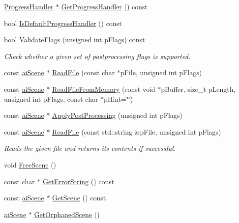 \begin{DoxyCompactItemize}
\hyperlink{class_assimp_1_1_progress_handler}{Progress\+Handler} $\ast$ \hyperlink{class_assimp_1_1_importer_ad5ab2509d8e72d6a58c55e6173179552}{Get\+Progress\+Handler} () const 
\item 
bool \hyperlink{class_assimp_1_1_importer_abfc6a55b0ab6b9e3e84c8135f686e012}{Is\+Default\+Progress\+Handler} () const 
\item 
bool \hyperlink{class_assimp_1_1_importer_af0053e7209aaca4e291359af16f3c0b6}{Validate\+Flags} (unsigned int p\+Flags) const 
\begin{DoxyCompactList}\small\item\em Check whether a given set of postprocessing flags is supported. \end{DoxyCompactList}\item 
const \hyperlink{structai_scene}{ai\+Scene} $\ast$ \hyperlink{class_assimp_1_1_importer_afa338a135a56956bd5deb7d238498dde}{Read\+File} (const char $\ast$p\+File, unsigned int p\+Flags)
\item 
const \hyperlink{structai_scene}{ai\+Scene} $\ast$ \hyperlink{class_assimp_1_1_importer_a9a423cef9ecadc777ea6c3952beb3ca2}{Read\+File\+From\+Memory} (const void $\ast$p\+Buffer, size\+\_\+t p\+Length, unsigned int p\+Flags, const char $\ast$p\+Hint=\char`\"{}\char`\"{})
\item 
const \hyperlink{structai_scene}{ai\+Scene} $\ast$ \hyperlink{class_assimp_1_1_importer_ace2fb85c67414a9d4ac6e69049eec7de}{Apply\+Post\+Processing} (unsigned int p\+Flags)
\item 
const \hyperlink{structai_scene}{ai\+Scene} $\ast$ \hyperlink{class_assimp_1_1_importer_a339882c7acb47d5b5110bbd078d870a9}{Read\+File} (const std\+::string \&p\+File, unsigned int p\+Flags)
\begin{DoxyCompactList}\small\item\em Reads the given file and returns its contents if successful. \end{DoxyCompactList}\item 
void \hyperlink{class_assimp_1_1_importer_abbe1b11100d25c0ef9930dce278b62a2}{Free\+Scene} ()
\item 
const char $\ast$ \hyperlink{class_assimp_1_1_importer_ad6b2c203d69dd00708674c759485db1a}{Get\+Error\+String} () const 
\item 
const \hyperlink{structai_scene}{ai\+Scene} $\ast$ \hyperlink{class_assimp_1_1_importer_ae6450d9e8e25bc83ba9dc533d967235c}{Get\+Scene} () const 
\item 
\hyperlink{structai_scene}{ai\+Scene} $\ast$ \hyperlink{class_assimp_1_1_importer_a8d7e1ef1bee4c9465e1c8689d96578cf}{Get\+Orphaned\+Scene} ()

\end{DoxyCompactItemize}

